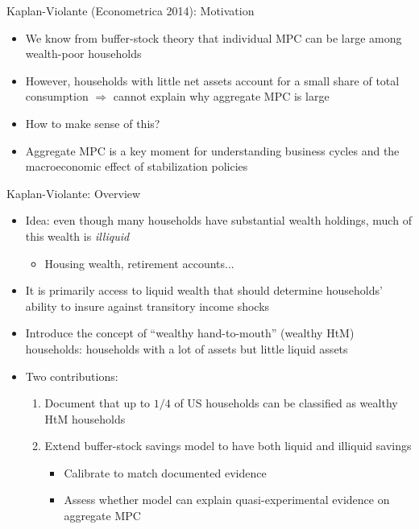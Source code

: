 \documentclass[9pt]{beamer}
\newcommand{\bit}{\begin{itemize}}
\newcommand{\eit}{\end{itemize}}
\newcommand{\ben}{\begin{enumerate}}
\newcommand{\een}{\end{enumerate}}
\begin{document}
\begin{frame}{Kaplan-Violante (Econometrica 2014): Motivation}

\bit
\setlength\itemsep{1em}

\item We know from buffer-stock theory that individual MPC can be large among wealth-poor households

\item However, households with little net assets account for a small share of total consumption $\Rightarrow$ cannot explain why aggregate MPC is large

\item How to make sense of this?

\item Aggregate MPC is a key moment for understanding business cycles and the macroeconomic effect of stabilization policies
\eit

\end{frame}

\begin{frame}{Kaplan-Violante: Overview}

\bit
\setlength\itemsep{2em}
\item Idea: even though many households have substantial wealth holdings, much of this wealth is \emph{illiquid}
\bit
	\item Housing wealth, retirement accounts...
\eit

\item It is primarily access to liquid wealth that should determine households' ability to insure against transitory income shocks

\item Introduce the concept of ``wealthy hand-to-mouth'' (wealthy HtM) households: households with a lot of assets but little liquid assets

\item Two contributions:
\ben
\setlength\itemsep{0.5em}
	\item Document that up to $1/4$ of US households can be classified as wealthy HtM households
	
	\item Extend buffer-stock savings model to have both liquid and illiquid savings
		\bit
		\setlength\itemsep{0.5em}
			\item Calibrate to match documented evidence
			
			\item Assess whether model can explain quasi-experimental evidence on aggregate MPC
		\eit
\een

\eit

\end{frame}
\end{document}
